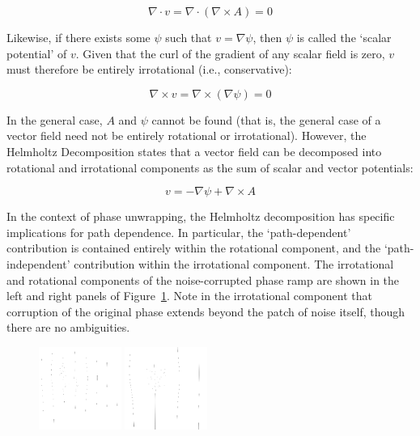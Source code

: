 \begin{equation}
\label{eqn:Div_Curl_Identity}
\nabla \cdot v = \nabla \cdot ( \nabla \times A ) = 0
\end{equation}

Likewise, if there exists some $\psi$ such that $v = \nabla \psi$, then $\psi$ is called the `scalar potential' of $v$.  Given that the curl of the gradient of any scalar field is zero, $v$ must therefore be entirely irrotational (i.e., conservative):

\begin{equation}
\label{eqn:Curl_Grad_Identity}
\nabla \times v = \nabla \times ( \nabla \psi ) = 0
\end{equation}

In the general case, $A$ and $\psi$ cannot be found (that is, the general case of a vector field need not be entirely rotational or irrotational).  However, the Helmholtz Decomposition states that a vector field can be decomposed into rotational and irrotational components as the sum of scalar and vector potentials:

\begin{equation}
\label{eqn:Helmholtz}
v = - \nabla \psi + \nabla \times A
\end{equation}

In the context of phase unwrapping, the Helmholtz decomposition has specific implications for path dependence.  In particular, the `path-dependent' contribution is contained entirely within the rotational component, and the `path-independent' contribution within the irrotational component.  The irrotational and rotational components of the noise-corrupted phase ramp are shown in the left and right panels of Figure~\ref{fig:Helmholtz_Decomposition}.  Note in the irrotational component that corruption of the original phase extends beyond the patch of noise itself, though there are no ambiguities.

\begin{figure}
\center
\includegraphics[width=0.24\textwidth]{images/3/02b_irrotational.png}
\includegraphics[width=0.24\textwidth]{images/3/02c_rotational.png}

\label{fig:Helmholtz_Decomposition}
\end{figure}

